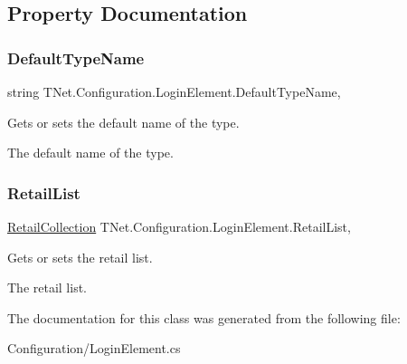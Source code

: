 \subsection{Property Documentation}
\mbox{\label{class_t_net_1_1_configuration_1_1_login_element_a718778b229264da65ea47504e3e99466}} 
\subsubsection{\texorpdfstring{Default\+Type\+Name}{DefaultTypeName}}
{\footnotesize\ttfamily string T\+Net.\+Configuration.\+Login\+Element.\+Default\+Type\+Name\hspace{0.3cm}{\ttfamily [get]}, {\ttfamily [set]}}



Gets or sets the default name of the type. 

The default name of the type.\mbox{\label{class_t_net_1_1_configuration_1_1_login_element_a6f8530fbe1c50b6676bb31af94b9d9f4}} 
\subsubsection{\texorpdfstring{Retail\+List}{RetailList}}
{\footnotesize\ttfamily \mbox{\hyperlink{class_t_net_1_1_configuration_1_1_retail_collection}{Retail\+Collection}} T\+Net.\+Configuration.\+Login\+Element.\+Retail\+List\hspace{0.3cm}{\ttfamily [get]}, {\ttfamily [set]}}



Gets or sets the retail list. 

The retail list.

The documentation for this class was generated from the following file\+:\begin{DoxyCompactItemize}
\item 
Configuration/Login\+Element.\+cs\end{DoxyCompactItemize}
